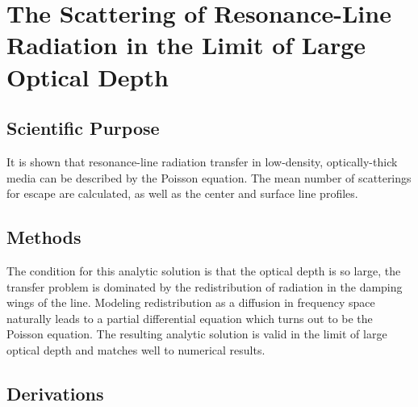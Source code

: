 \documentclass[onecolumn]{aastex63}
\begin{document}
\section{The Scattering of Resonance-Line Radiation in the Limit of Large Optical Depth}
\begin{centering}

\cite{harrington1973}

\end{centering}



\subsection{Scientific Purpose}
It is shown that resonance-line radiation transfer in low-density, optically-thick media can be described by the Poisson equation. The mean number of scatterings for escape are calculated, as well as the center and surface line profiles.

\subsection{Methods}
The condition for this analytic solution is that the optical depth is so large, the transfer problem is dominated by the redistribution of radiation in the damping wings of the line. Modeling redistribution as a diffusion in frequency space naturally leads to a partial differential equation which turns out to be the Poisson equation. The resulting analytic solution is valid in the limit of large optical depth and matches well to numerical results.

\subsection{Derivations}
\end{document}
